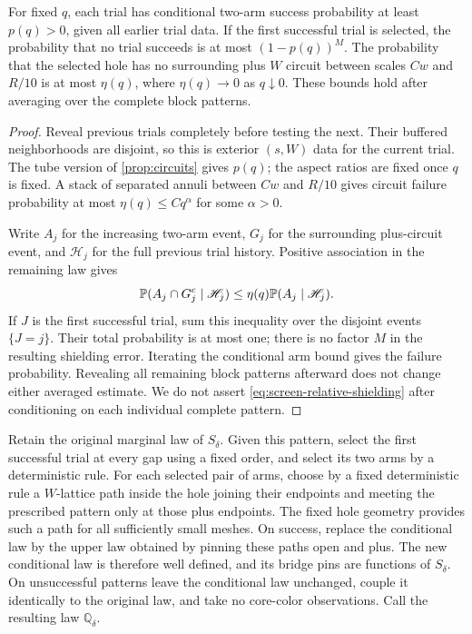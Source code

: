 \begin{lemma}
\label{lem:screen-shielding}
For fixed $q$, each trial has conditional two-arm success probability
at least $p(q)>0$, given all earlier trial data. If the first successful
trial is selected, the probability that no trial succeeds is at most
$(1-p(q))^M$. The probability that the selected hole has no surrounding
plus $W$ circuit between scales $Cw$ and $R/10$ is at most $\eta(q)$,
where $\eta(q)\to0$ as $q\downarrow0$. These bounds hold after
averaging over the complete block patterns.
\end{lemma}

\begin{proof}
Reveal previous trials completely before testing the next. Their buffered
neighborhoods are disjoint, so this is exterior $(s,W)$ data for the
current trial. The tube version of \cref{prop:circuits} gives $p(q)$;
the aspect ratios are fixed once $q$ is fixed. A stack of separated
annuli between $Cw$ and $R/10$ gives circuit failure probability at most
$\eta(q)\le Cq^\alpha$ for some $\alpha>0$.

Write $A_j$ for the increasing two-arm event, $G_j$ for the surrounding
plus-circuit event, and $\mathscr H_j$ for the full previous trial
history. Positive association in the remaining law gives
\begin{equation}
 \P(A_j\cap G_j^c\mid\mathscr H_j)
 \le \eta(q)\P(A_j\mid\mathscr H_j).
 \label{eq:screen-relative-shielding}
\end{equation}
If $J$ is the first successful trial, sum this inequality over the
disjoint events $\{J=j\}$. Their total probability is at most one;
there is no factor $M$ in the resulting shielding error. Iterating the
conditional arm bound gives the failure probability. Revealing all
remaining block patterns afterward does not change either averaged
estimate. We do not assert \eqref{eq:screen-relative-shielding} after
conditioning on each individual complete pattern.
\end{proof}

Retain the original marginal law of $S_\delta$. Given this pattern,
select the first successful trial at every gap using a fixed order,
and select its two arms by a deterministic rule. For each selected pair
of arms, choose by a fixed deterministic rule a $W$-lattice path inside
the hole joining their endpoints and meeting the prescribed pattern only
at those plus endpoints. The fixed hole geometry provides such a path for
all sufficiently small meshes. On success, replace the conditional law
by the upper law obtained by pinning these paths open and plus. The new
conditional law is therefore well defined, and its bridge pins are
functions of $S_\delta$.
On unsuccessful patterns leave the conditional law unchanged, couple it
identically to the original law, and take no core-color observations.
Call the resulting law $\mathbb Q_\delta$.

